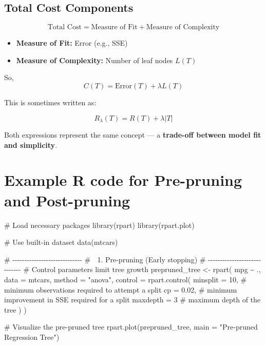 \documentclass[
  letterpaper,
  DIV=11,
  numbers=noendperiod]{scrreprt}
\newenvironment{Shaded}{\begin{snugshade}}{\end{snugshade}}
\newcommand{\AttributeTok}[1]{\textcolor[rgb]{0.40,0.45,0.13}{#1}}
\newcommand{\CommentTok}[1]{\textcolor[rgb]{0.37,0.37,0.37}{#1}}
\newcommand{\DecValTok}[1]{\textcolor[rgb]{0.68,0.00,0.00}{#1}}
\newcommand{\FloatTok}[1]{\textcolor[rgb]{0.68,0.00,0.00}{#1}}
\newcommand{\FunctionTok}[1]{\textcolor[rgb]{0.28,0.35,0.67}{#1}}
\newcommand{\NormalTok}[1]{\textcolor[rgb]{0.00,0.23,0.31}{#1}}
\newcommand{\OtherTok}[1]{\textcolor[rgb]{0.00,0.23,0.31}{#1}}
\newcommand{\SpecialCharTok}[1]{\textcolor[rgb]{0.37,0.37,0.37}{#1}}
\newcommand{\StringTok}[1]{\textcolor[rgb]{0.13,0.47,0.30}{#1}}
\providecommand{\tightlist}{%
  \setlength{\itemsep}{0pt}\setlength{\parskip}{0pt}}\usepackage{longtable,booktabs,array}
\begin{document}
\subsection{Total Cost Components}\label{total-cost-components}

\[
\text{Total Cost} = \text{Measure of Fit} + \text{Measure of Complexity}
\]

\begin{itemize}
\tightlist
\item
  \textbf{Measure of Fit:} Error (e.g., SSE)\\
\item
  \textbf{Measure of Complexity:} Number of leaf nodes \(L(T)\)
\end{itemize}

So, \[
C(T) = \text{Error}(T) + \lambda L(T)
\]

This is sometimes written as:

\[
R_\lambda(T) = R(T) + \lambda |T|
\]

Both expressions represent the same concept --- a \textbf{trade-off
between model fit and simplicity}.

\section{Example R code for Pre-pruning and
Post-pruning}\label{example-r-code-for-pre-pruning-and-post-pruning}

\begin{Shaded}
\begin{Highlighting}[]
\CommentTok{\# Load necessary packages}
\FunctionTok{library}\NormalTok{(rpart)}
\FunctionTok{library}\NormalTok{(rpart.plot)}

\CommentTok{\# Use built{-}in dataset}
\FunctionTok{data}\NormalTok{(mtcars)}

\CommentTok{\# {-}{-}{-}{-}{-}{-}{-}{-}{-}{-}{-}{-}{-}{-}{-}{-}{-}{-}{-}{-}{-}{-}{-}{-}{-}{-}{-}{-}{-}}
\CommentTok{\# 🌱 1. Pre{-}pruning (Early stopping)}
\CommentTok{\# {-}{-}{-}{-}{-}{-}{-}{-}{-}{-}{-}{-}{-}{-}{-}{-}{-}{-}{-}{-}{-}{-}{-}{-}{-}{-}{-}{-}{-}}
\CommentTok{\# Control parameters limit tree growth}
\NormalTok{prepruned\_tree }\OtherTok{\textless{}{-}} \FunctionTok{rpart}\NormalTok{(}
\NormalTok{  mpg }\SpecialCharTok{\textasciitilde{}}\NormalTok{ ., }
  \AttributeTok{data =}\NormalTok{ mtcars,}
  \AttributeTok{method =} \StringTok{"anova"}\NormalTok{,}
  \AttributeTok{control =} \FunctionTok{rpart.control}\NormalTok{(}
    \AttributeTok{minsplit =} \DecValTok{10}\NormalTok{,   }\CommentTok{\# minimum observations required to attempt a split}
    \AttributeTok{cp =} \FloatTok{0.02}\NormalTok{,       }\CommentTok{\# minimum improvement in SSE required for a split}
    \AttributeTok{maxdepth =} \DecValTok{3}     \CommentTok{\# maximum depth of the tree}
\NormalTok{  )}
\NormalTok{)}

\CommentTok{\# Visualize the pre{-}pruned tree}
\FunctionTok{rpart.plot}\NormalTok{(prepruned\_tree, }\AttributeTok{main =} \StringTok{"Pre{-}pruned Regression Tree"}\NormalTok{)}
\end{Highlighting}
\end{Shaded}
\end{document}
